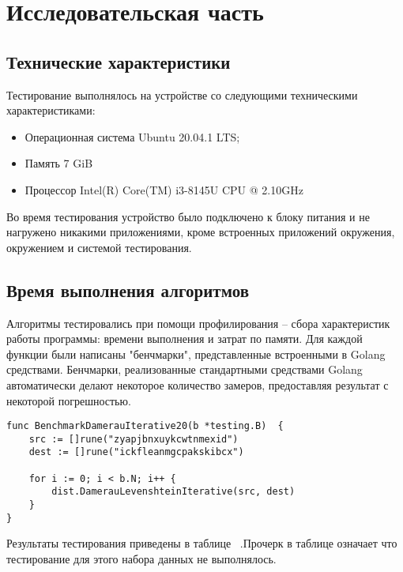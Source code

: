 \chapter{Исследовательская часть}
\section{Технические характеристики}
Тестирование выполнялось на устройстве со следующими техническими характеристиками:
\begin{itemize}
	\item Операционная система Ubuntu 20.04.1 LTS;
	\item Память 7 GiB
	\item Процессор Intel(R) Core(TM) i3-8145U CPU @ 2.10GHz
\end{itemize}
Во время тестирования устройство было подключено к блоку питания и не нагружено никакими приложениями, кроме встроенных приложений окружения, окружением и системой тестирования.
\section{Время выполнения алгоритмов}
Алгоритмы тестировались при помощи профилирования -- сбора характеристик работы программы: времени выполнения и затрат по памяти. Для каждой функции были написаны "бенчмарки"\cite{test}, представленные встроенными в Golang средствами. Бенчмарки, реализованные стандартными средствами Golang автоматически делают некоторое количество замеров, предоставляя результат с некоторой погрешностью.
\begin{lstlisting}[label=bench,caption=Пример бенчмарка]
func BenchmarkDamerauIterative20(b *testing.B)  {
	src := []rune("zyapjbnxuykcwtnmexid")
	dest := []rune("ickfleanmgcpakskibcx")
	
	for i := 0; i < b.N; i++ {
		dist.DamerauLevenshteinIterative(src, dest)
	}
}
\end{lstlisting}
Результаты тестирования приведены в таблице \ .Прочерк в таблице означает что тестирование для этого набора данных не выполнялось.


